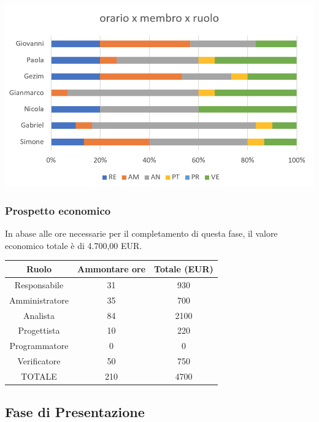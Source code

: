 \includegraphics[width=\textwidth]{res/img/h12}

\subsubsection{Prospetto economico}
In abase alle ore necessarie per il completamento di questa fase, il valore economico totale è di 4.700,00 EUR.
\begin{center}
\begin{tabular}{ |c|c|c|  }
 \hline
 Ruolo 		& Ammontare ore 	& Totale (EUR)\\
 	\hline
 \hline
 	Responsabile	& 31 	& 930\\
	Amministratore	& 35		& 700\\
	Analista		& 84 	& 2100\\
	Progettista		& 10		& 220\\
	Programmatore	& 0		& 0\\
	Verificatore	& 50		& 750\\
 \hline\hline
 TOTALE		& 210		& 4700\\
  \hline
\end{tabular}
\end{center}
\newpage
\subsection{Fase di Presentazione}
